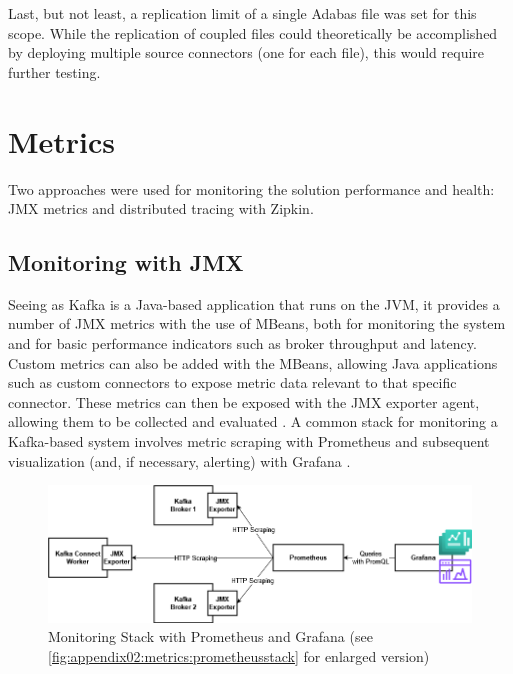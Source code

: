 Last, but not least, a replication limit of a single Adabas file was set for this scope. While the replication of coupled files could theoretically be accomplished by deploying multiple source connectors (one for each file), this would require further testing.

\section{Metrics}
\label{ch04:pipelinedevelopment:metrics}
Two approaches were used for monitoring the solution performance and health: \ac{JMX} metrics and distributed tracing with Zipkin.

\subsection{Monitoring with JMX}
Seeing as Kafka is a Java-based application that runs on the \ac{JVM}, it provides a number of \ac{JMX} metrics with the use of \ac{MBeans}, both for monitoring the system and for basic performance indicators such as broker throughput and latency. Custom metrics can also be added with the \ac{MBeans}, allowing Java applications such as custom connectors to expose metric data relevant to that specific connector. These metrics can then be exposed with the \ac{JMX} exporter agent, allowing them to be collected and evaluated \cite{kafkamonitoringgrafana}. A common stack for monitoring a Kafka-based system involves metric scraping with Prometheus and subsequent visualization (and, if necessary, alerting) with Grafana \cite{applicationmonitoringkafka}.

\begin{figure}[htbp]
 \centering
 \includegraphics[width=1\textwidth]{chapters/images/kafka prometheus monitoring stack enlarged.drawio.png}
 \caption[Monitoring Stack with Prometheus and Grafana]{Monitoring Stack with Prometheus and Grafana (see \ref{fig:appendix02:metrics:prometheusstack} for enlarged version)}
 \label{fig:chapter04:metrics:prometheusstack}
\end{figure}

